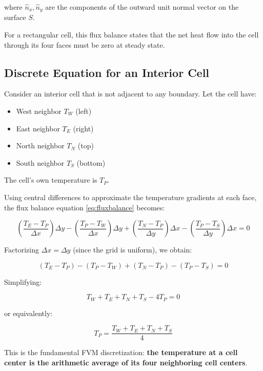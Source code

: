 \documentclass{article}
\begin{document}
where $\hat{n}_x, \hat{n}_y$ are the components of the outward unit normal vector on the surface $S$.

For a rectangular cell, this flux balance states that the net heat flow into the cell through its four faces must be zero at steady state.

\subsection{Discrete Equation for an Interior Cell}

Consider an interior cell that is not adjacent to any boundary. Let the cell have:
\begin{itemize}
    \item West neighbor $T_W$ (left)
    \item East neighbor $T_E$ (right)
    \item North neighbor $T_N$ (top)
    \item South neighbor $T_S$ (bottom)
\end{itemize}
The cell's own temperature is $T_P$.

Using central differences to approximate the temperature gradients at each face, the flux balance equation \ref{eq:fluxbalance} becomes:

\begin{equation}
\left( \frac{T_E - T_P}{\Delta x} \right) \Delta y - \left( \frac{T_P - T_W}{\Delta x} \right) \Delta y + \left( \frac{T_N - T_P}{\Delta y} \right) \Delta x - \left( \frac{T_P - T_S}{\Delta y} \right) \Delta x = 0
\end{equation}

Factorizing $\Delta x = \Delta y$ (since the grid is uniform), we obtain:

\begin{equation}
(T_E - T_P) - (T_P - T_W) + (T_N - T_P) - (T_P - T_S) = 0
\end{equation}

Simplifying:

\begin{equation}
T_W + T_E + T_N + T_S - 4T_P = 0
\label{eq:discrete_interior}
\end{equation}

or equivalently:

\begin{equation}
T_P = \frac{T_W + T_E + T_N + T_S}{4}
\end{equation}

This is the fundamental FVM discretization: \textbf{the temperature at a cell center is the arithmetic average of its four neighboring cell centers}.
\end{document}
